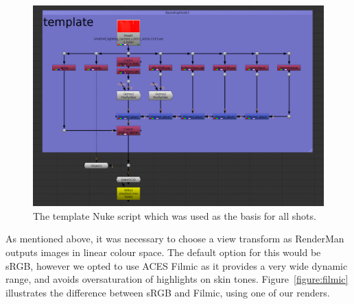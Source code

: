 \documentclass[11pt]{article}
\begin{document}
\begin{figure}[htbp]\centering
	\includegraphics[width=1.0\linewidth]{images/compTemplate.png}
	\caption{\label{figure:compTemplate} The template Nuke script which was used as the basis for all shots.}
\end{figure}

As mentioned above, it was necessary to choose a view transform as RenderMan outputs images in linear colour space. The default option for this would be sRGB, however we opted to use ACES Filmic as it provides a very wide dynamic range, and avoids oversaturation of highlights on skin tones. Figure~\ref{figure:filmic} illustrates the difference between sRGB and Filmic, using one of our renders.
\end{document}
